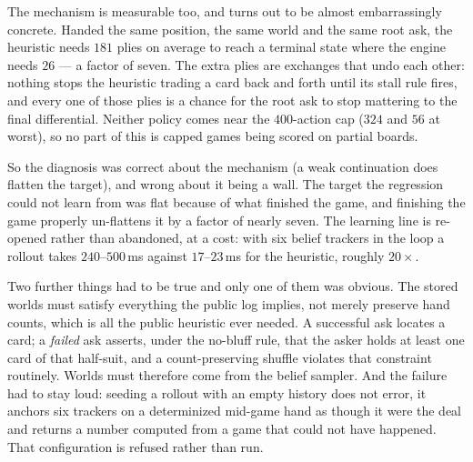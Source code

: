 \documentclass[11pt,letterpaper]{article}
\begin{document}
The mechanism is measurable too, and turns out to be almost embarrassingly
concrete. Handed the same position, the same world and the same root ask, the
heuristic needs $181$ plies on average to reach a terminal state where the
engine needs $26$ --- a factor of seven. The extra plies are exchanges that undo
each other: nothing stops the heuristic trading a card back and forth until its
stall rule fires, and every one of those plies is a chance for the root ask to
stop mattering to the final differential. Neither policy comes near the
$400$-action cap ($324$ and $56$ at worst), so no part of this is capped games
being scored on partial boards.

So the diagnosis was correct about the mechanism (a weak continuation does
flatten the target), and wrong about it being a wall. The target the
regression could not learn from was flat because of what finished the game, and
finishing the game properly un-flattens it by a factor of nearly seven. The
learning line is re-opened rather than abandoned, at a cost: with six belief
trackers in the loop a rollout takes $240$--$500$\,ms against $17$--$23$\,ms for
the heuristic, roughly $20\times$.

Two further things had to be true and only one of them was obvious. The stored
worlds must satisfy everything the public log implies, not merely preserve
hand counts, which is all the public heuristic ever needed. A successful ask
locates a card; a \emph{failed} ask asserts, under the no-bluff rule, that the
asker holds at least one card of that half-suit, and a count-preserving shuffle
violates that constraint routinely. Worlds must therefore come from the belief
sampler. And the failure had to stay loud: seeding a rollout with an empty
history does not error, it anchors six trackers on a determinized mid-game hand
as though it were the deal and returns a number computed from a game that could
not have happened. That configuration is refused rather than run.
\end{document}
